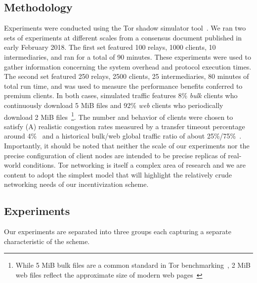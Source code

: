 \subsection{Methodology}
\label{subsec:methodology}


Experiments were conducted using the Tor shadow simulator
tool~\cite{jansen2011shadow, tracey2018high}. We ran two sets of experiments at
different scales from a consensus document published in early February 2018. The
first set featured 100 relays, 1000 clients, 10 intermediaries, and ran for a
total of 90 minutes. These experiments were used to gather information
concerning the system overhead and protocol execution times. The second set
featured 250 relays, 2500 clients, 25 intermediaries, 80 minutes of total run
time, and was used to measure the performance benefits conferred to premium
clients. In both cases, simulated traffic features 8\% \emph{bulk} clients who
continuously download 5 MiB files and 92\% \emph{web} clients who periodically
download 2 MiB files~\footnote{While 5 MiB bulk files are a common standard in
  Tor benchmarking~\cite{portal2018tormetrics}, 2 MiB web files reflect the
  approximate size of modern web pages~\cite{team2018httparchive}}. The number
and behavior of clients were chosen to satisfy (A) realistic congestion rates
measured by a transfer timeout percentage around 4\%~\cite{portal2018tormetrics}
and a historical bulk/web global traffic ratio of about
25\%/75\%~\cite{privcount-ccs2016, learning-ccs2018}. Importantly, it should be
noted that neither the scale of our experiments nor the precise configuration of
client nodes are intended to be precise replicas of real-world conditions. Tor
networking is itself a complex area of research and we are content to adopt the
simplest model that will highlight the relatively crude networking needs of our
incentivization scheme.

\subsection{Experiments}
\label{subsec:experiments}
Our experiments are separated into three groups each capturing a separate
characteristic of the scheme.

